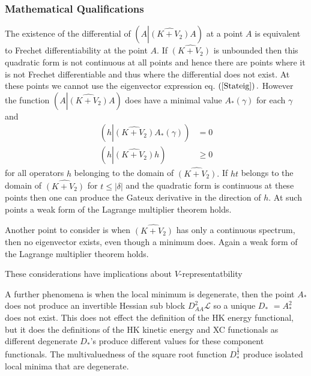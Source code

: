 \documentclass[aps,preprint]{revtex4}%
\begin{document}
\subsubsection{Mathematical Qualifications}

The existence of the differential of $\left(  A\left\vert \widehat{\left(
K+V_{2}\right)  }A\right.  \right)  $ at a point $A$ is equivalent to Frechet
differentiability at the point $A$. If $\widehat{\left(  K+V_{2}\right)  }$ is
unbounded then this quadratic form is not continuous at all points and hence
there are points where it is not Frechet differentiable and thus where the
differential does not exist. At these points we cannot use the eigenvector
expression eq. $\left(  \ref{Stateig}\right)  .$ However the function $\left(
A\left\vert \widehat{\left(  K+V_{2}\right)  }A\right.  \right)  $ does have a
minimal value $A_{\ast}\left(  \gamma\right)  $ for each $\gamma$ and
\begin{align}
\left(  h\left\vert \widehat{\left(  K+V_{2}\right)  }A_{\ast}\left(
\gamma\right)  \right.  \right)   &  =0\\
\left(  h\left\vert \widehat{\left(  K+V_{2}\right)  }h\right.  \right)   &
\geq0
\end{align}
for all operators $h$ belonging to the domain of $\widehat{\left(
K+V_{2}\right)  }.$ If $ht$ belongs to the domain of $\widehat{\left(
K+V_{2}\right)  }$ for $t\leq\left\vert \delta\right\vert $ and the quadratic
form is continuous at these points then one can produce the Gateux derivative
in the direction of $h.$ At such points a weak form of the Lagrange multiplier
theorem holds.

Another point to consider is when $\widehat{\left(  K+V_{2}\right)  }$ has
only a continuous spectrum, then no eigenvector exists, even though a minimum
does. Again a weak form of the Lagrange multiplier theorem holds.

These considerations have implications about $V$-representatbility \cite{Vrep}

A further phenomena is when the local minimum is degenerate, then the point
$A_{\ast}$ does not produce an invertible Hessian sub block $D_{AA}%
^{2}\mathcal{L}$ so a unique $D_{\ast}$ $=A_{\ast}^{2}$ does not exist. This
does not effect the definition of the HK energy functional, but it does the
definitions of the HK kinetic energy and XC functionals as different
degenerate $D_{\ast}$'s produce different values for these component
functionals. The multivaluedness of the square root function $D_{\ast}%
^{\frac{1}{2}}$ produce isolated local minima that are degenerate.
\end{document}

